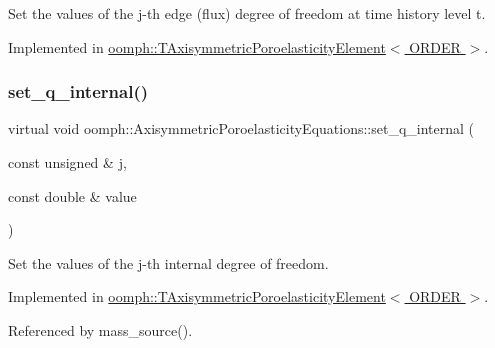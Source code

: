 Set the values of the j-\/th edge (flux) degree of freedom at time history level t. 



Implemented in \hyperlink{classoomph_1_1TAxisymmetricPoroelasticityElement_aa6aa64af2580183c4e81a1466c6e467f}{oomph\+::\+T\+Axisymmetric\+Poroelasticity\+Element$<$ O\+R\+D\+E\+R $>$}.

\mbox{\label{classoomph_1_1AxisymmetricPoroelasticityEquations_a50d888d78b1115aa95226ddcb34d5969}} 
\subsubsection{\texorpdfstring{set\+\_\+q\+\_\+internal()}{set\_q\_internal()}\hspace{0.1cm}{\footnotesize\ttfamily [1/2]}}
{\footnotesize\ttfamily virtual void oomph\+::\+Axisymmetric\+Poroelasticity\+Equations\+::set\+\_\+q\+\_\+internal (\begin{DoxyParamCaption}\item[{const unsigned \&}]{j,  }\item[{const double \&}]{value }\end{DoxyParamCaption})\hspace{0.3cm}{\ttfamily [pure virtual]}}



Set the values of the j-\/th internal degree of freedom. 



Implemented in \hyperlink{classoomph_1_1TAxisymmetricPoroelasticityElement_a7c5a9c57e9cbbe808b42ebe9aa727014}{oomph\+::\+T\+Axisymmetric\+Poroelasticity\+Element$<$ O\+R\+D\+E\+R $>$}.



Referenced by mass\+\_\+source().

\mbox{\label{classoomph_1_1AxisymmetricPoroelasticityEquations_af63d9e9769c923b3f1184e80d3c62569}} 
